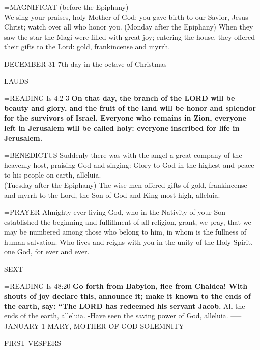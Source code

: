 \hangindent=\parindent \small{MAGNIFICAT  (before the Epiphany)\\}
We sing your praises, holy Mother of God: you gave birth to our Savior, Jesus Christ; watch over all who honor you.
(Monday after the Epiphany)
When they saw the star the Magi were filled with great joy; entering the house, they offered their gifts to the Lord: gold, frankincense and myrrh.

DECEMBER 31
7th day in the octave of Christmas

\begin{flushleft}\normalsize LAUDS\\\end{flushleft}
\hangindent=\parindent \small{READING}    Is 4:2-3 \textbf{   On that day, the branch of the LORD will be beauty and glory, and the fruit of the land will be honor and splendor for the survivors of Israel. Everyone who remains in Zion, everyone left in Jerusalem will be called holy: everyone inscribed for life in Jerusalem.\\}

\hangindent=\parindent \small{BENEDICTUS 	Suddenly there was with the angel a great company of the heavenly host, praising God and singing: Glory to God in the highest and peace to his people on earth, alleluia.\\}
(Tuesday after the Epiphany)
The wise men offered gifts of gold, frankincense and myrrh to the Lord, the Son of God and King most high, alleluia.

\hangindent=\parindent \small{PRAYER 	Almighty ever-living God, who in the Nativity of your Son established the beginning and fulfillment of all religion, grant, we pray, that we may be numbered among those who belong to him, in whom is the fullness of human salvation. Who lives and reigns with you in the unity of the Holy Spirit, one God, for ever and ever.}

\begin{flushleft}\normalsize SEXT\\\end{flushleft}
\hangindent=\parindent \small{READING}    Is 48:20 \textbf{   Go forth from Babylon, flee from Chaldea! With shouts of joy declare this, announce it; make it known to the ends of the earth, say: “The LORD has redeemed his servant Jacob.}
All the ends of the earth, alleluia.
-Have seen the saving power of God, alleluia.
-----
JANUARY 1
MARY, MOTHER OF GOD
SOLEMNITY

\begin{flushleft}\normalsize FIRST VESPERS\\\end{flushleft}

